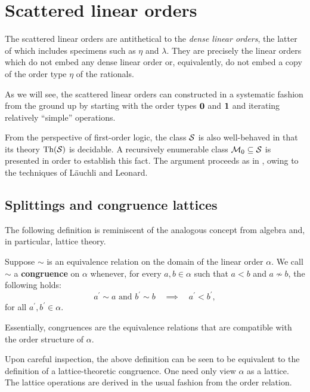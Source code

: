 

\chapter{Scattered linear orders}

The scattered linear orders are antithetical to the \textit{dense linear
orders}, the latter of which includes specimens such as $\eta$ and $\lambda$.
They are precisely the linear orders which do not embed any dense linear order
or, equivalently, do not embed a copy of the order type $\eta$ of the
rationals.

As we will see, the scattered linear orders can constructed in a systematic
fashion from the ground up by starting with the order types $\mathbf{0}$ and $\mathbf{1}$
and iterating relatively ``simple'' operations.

From the perspective of first-order logic, the class $\mathcal{S}$ is also
well-behaved in that its theory $\operatorname{Th}(\mathcal{S})$ is decidable.  A recursively
enumerable class $\mathcal{M}_0\subseteq\mathcal{S}$ is presented in order to establish
this fact.  The argument proceeds as in \cite{RosLin}, owing to the techniques
of L\"auchli and Leonard.

\section{Splittings and congruence lattices}

The following definition is reminiscent of the analogous concept from algebra
and, in particular, lattice theory.
\begin{dfn}[Congruence]
	Suppose $\sim$ is an equivalence relation on the domain of the linear order
	$\alpha$.  We call $\sim$ a \textbf{congruence} on $\alpha$ whenever, for
	every $a,b\in\alpha$ such that $a<b$ and $a\nsim b$, the following
	holds:
	\begin{equation}
		a^\prime\sim a\text{ and }b^\prime\sim b\quad\implies\quad
		a^\prime<b^\prime,
	\end{equation}
	for all $a^\prime,b^\prime\in\alpha$.
\end{dfn}

Essentially, congruences are the equivalence relations that are compatible with
the order structure of $\alpha$.

Upon careful inspection, the above definition can be seen to be equivalent to
the definition of a lattice-theoretic congruence.  One need only view $\alpha$
as a lattice.  The lattice operations are derived in the usual fashion from the
order relation.

